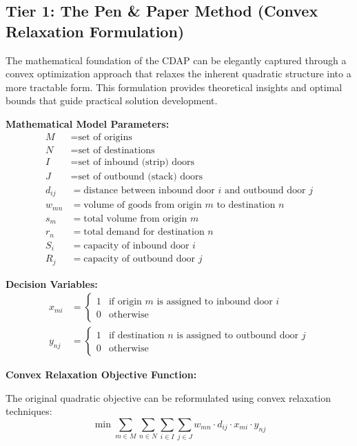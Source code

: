 \documentclass{article}
\begin{document}
\subsection{Tier 1: The Pen \& Paper Method (Convex Relaxation Formulation)}

The mathematical foundation of the CDAP can be elegantly captured through a convex optimization approach that relaxes the inherent quadratic structure into a more tractable form. This formulation provides theoretical insights and optimal bounds that guide practical solution development.

\textbf{Mathematical Model Parameters:}
\begin{align}
M &= \text{set of origins} \\
N &= \text{set of destinations} \\
I &= \text{set of inbound (strip) doors} \\
J &= \text{set of outbound (stack) doors} \\
d_{ij} &= \text{distance between inbound door } i \text{ and outbound door } j \\
w_{mn} &= \text{volume of goods from origin } m \text{ to destination } n \\
s_m &= \text{total volume from origin } m \\
r_n &= \text{total demand for destination } n \\
S_i &= \text{capacity of inbound door } i \\
R_j &= \text{capacity of outbound door } j
\end{align}

\textbf{Decision Variables:}
\begin{align}
x_{mi} &= \begin{cases} 1 & \text{if origin } m \text{ is assigned to inbound door } i \\ 0 & \text{otherwise} \end{cases} \\
y_{nj} &= \begin{cases} 1 & \text{if destination } n \text{ is assigned to outbound door } j \\ 0 & \text{otherwise} \end{cases}
\end{align}

\textbf{Convex Relaxation Objective Function:}

The original quadratic objective can be reformulated using convex relaxation techniques:
\begin{equation}
\min \sum_{m \in M} \sum_{n \in N} \sum_{i \in I} \sum_{j \in J} w_{mn} \cdot d_{ij} \cdot x_{mi} \cdot y_{nj}
\end{equation}
\end{document}
